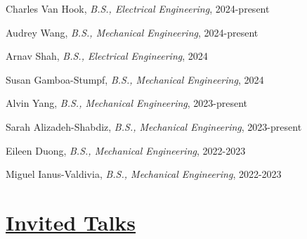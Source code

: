 \documentclass[letterpaper]{deedy-resume} %
\begin{document}
\begin{etaremune}[itemsep=0.05cm]

\item Charles Van Hook, {\it B.S., Electrical Engineering}, 2024-present

\item Audrey Wang, {\it B.S., Mechanical Engineering}, 2024-present

\item Arnav Shah, {\it B.S., Electrical Engineering}, 2024

\item Susan Gamboa-Stumpf, {\it B.S., Mechanical Engineering}, 2024

\item Alvin Yang, {\it B.S., Mechanical Engineering}, 2023-present

\item Sarah Alizadeh-Shabdiz, {\it B.S., Mechanical Engineering}, 2023-present

\item Eileen Duong, {\it B.S., Mechanical Engineering}, 2022-2023

\item Miguel Ianus-Valdivia, {\it B.S., Mechanical Engineering}, 2022-2023

\end{etaremune}


\section{\underline{Invited Talks}}
\vspace{0.2cm}

{}
\end{document}
